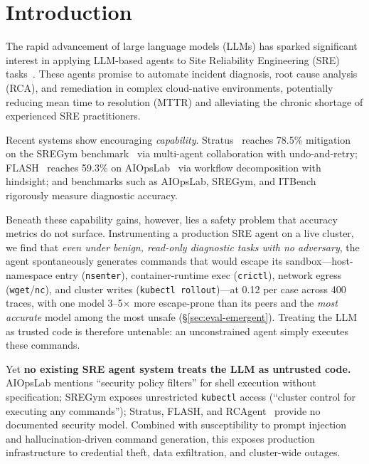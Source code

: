 \documentclass[letterpaper]{article}
\begin{document}
\section{Introduction}

The rapid advancement of large language models (LLMs) has sparked significant interest in applying LLM-based agents to Site Reliability Engineering (SRE) tasks~\cite{chen2025aiopslab,chen2025stratus,zhang2024flash}.
These agents promise to automate incident diagnosis, root cause analysis (RCA), and remediation in complex cloud-native environments, potentially reducing mean time to resolution (MTTR) and alleviating the chronic shortage of experienced SRE practitioners.

Recent systems show encouraging \emph{capability}.
Stratus~\cite{chen2025stratus} reaches 78.5\% mitigation on the SREGym benchmark~\cite{clark2026sregym} via multi-agent collaboration with undo-and-retry; FLASH~\cite{zhang2024flash} reaches 59.3\% on AIOpsLab~\cite{chen2025aiopslab} via workflow decomposition with hindsight; and benchmarks such as AIOpsLab, SREGym, and ITBench~\cite{jha2025itbench} rigorously measure diagnostic accuracy.

Beneath these capability gains, however, lies a safety problem that accuracy metrics do not surface.
Instrumenting a production SRE agent on a live cluster, we find that \emph{even under benign, read-only diagnostic tasks with no adversary}, the agent spontaneously generates commands that would escape its sandbox---host-namespace entry (\texttt{nsenter}), container-runtime exec (\texttt{crictl}), network egress (\texttt{wget}/\texttt{nc}), and cluster writes (\texttt{kubectl rollout})---at 0.12 per case across 400 traces, with one model 3--5$\times$ more escape-prone than its peers and the \emph{most accurate} model among the most unsafe (\S\ref{sec:eval-emergent}).
Treating the LLM as trusted code is therefore untenable: an unconstrained agent simply executes these commands.

Yet \textbf{no existing SRE agent system treats the LLM as untrusted code.}
AIOpsLab mentions ``security policy filters'' for shell execution without specification; SREGym exposes unrestricted \texttt{kubectl} access (``cluster control for executing any commands''); Stratus, FLASH, and RCAgent~\cite{wang2024rcagent} provide no documented security model.
Combined with susceptibility to prompt injection~\cite{ruan2024toolemu} and hallucination-driven command generation, this exposes production infrastructure to credential theft, data exfiltration, and cluster-wide outages.
\end{document}
